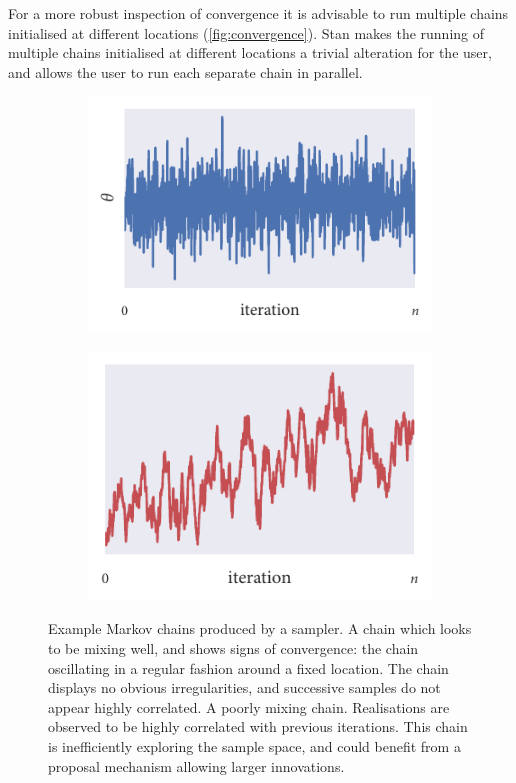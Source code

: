 For a more robust inspection of convergence it is advisable to run multiple
chains initialised at different locations (\cref{fig:convergence}). Stan makes
the running of multiple chains initialised at different locations a trivial
alteration for the user, and allows the user to run each separate chain in
parallel.

\begin{figure}[tpb]
  \begin{subfigure}[b]{0.5\textwidth}
    \centering
    \includegraphics{good_mixing.pdf}
    \subcaption{}
    \label{fig:good_mixing}
  \end{subfigure}%
  \begin{subfigure}[b]{0.5\textwidth}
    \centering
    \includegraphics{poor_mixing.pdf}
    \subcaption{}
    \label{fig:poor_mixing}
  \end{subfigure}
  \caption{Example Markov chains produced by a sampler.
       A chain which looks to be mixing well, and
      shows signs of convergence: the chain oscillating in a regular fashion
      around a fixed location. The chain displays no obvious irregularities,
      and successive samples do not appear highly correlated.
       A poorly mixing chain. Realisations
      are observed to be highly correlated with previous iterations. This chain
      is inefficiently exploring the sample space, and could benefit from a
      proposal mechanism allowing larger innovations.}
  \label{fig:mixing}
\end{figure}

